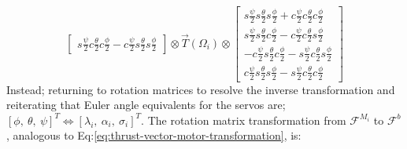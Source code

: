 \begin{subequations}
\begin{equation}
\begin{bmatrix}
s\frac{\psi}{2}c\frac{\theta}{2}c\frac{\phi}{2}-c\frac{\psi}{2}s\frac{\theta}{2}s\frac{\phi}{2}
\end{bmatrix}
\otimes
\vec{T}(\Omega_i)
\otimes
\begin{bmatrix}
s\frac{\psi}{2}s\frac{\theta}{2}s\frac{\phi}{2}+c\frac{\psi}{2}c\frac{\theta}{2}c\frac{\phi}{2}\\
s\frac{\psi}{2}s\frac{\theta}{2}c\frac{\phi}{2}-c\frac{\psi}{2}c\frac{\theta}{2}s\frac{\phi}{2}\\
-c\frac{\psi}{2}s\frac{\theta}{2}c\frac{\phi}{2}-s\frac{\psi}{2}c\frac{\theta}{2}s\frac{\phi}{2}\\
c\frac{\psi}{2}s\frac{\theta}{2}s\frac{\phi}{2}-s\frac{\psi}{2}c\frac{\theta}{2}c\frac{\phi}{2}
\end{bmatrix}
\end{equation}
\end{subequations}
Instead; returning to rotation matrices to resolve the inverse transformation and reiterating that Euler angle equivalents for the servos are; $[\phi,~\theta,~\psi]^T\iff [\lambda_i,~\alpha_i,~\sigma_i]^T$. The rotation matrix transformation from $\mathcal{F}^{M_i}$ to $\mathcal{F}^b$, analogous to Eq:\ref{eq:thrust-vector-motor-transformation}, is:
